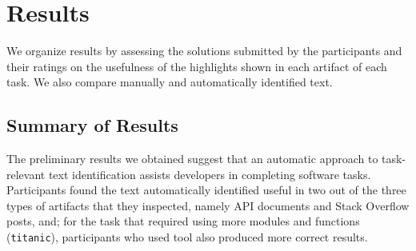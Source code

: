 
\section{Results}
\label{cp6:results}

We organize results by assessing the solutions submitted by the participants
and their ratings on the usefulness of the highlights shown 
in each artifact of each task. We also compare manually and automatically identified text.









\subsection{Summary of Results}


The preliminary results we obtained suggest that 
an automatic approach to task-relevant text identification
assists 
developers in completing software tasks. 
Participants found the text automatically identified
useful in two out of the three types of artifacts that they inspected, 
namely API documents and Stack Overflow posts, and; 
for the task that required using more modules and functions (\texttt{titanic}),
participants who used \acs{tool} also produced more correct results.





